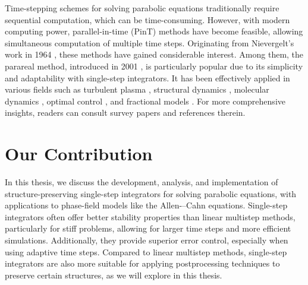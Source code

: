 \documentclass[a4paper, oneside]{book}
\begin{document}
Time-stepping schemes for solving parabolic equations traditionally require sequential computation, which can be time-consuming. However, with modern computing power, parallel-in-time (PinT) methods have become feasible, allowing simultaneous computation of multiple time steps. Originating from Nievergelt's work in 1964 \cite{Nievergelt:1964}, these methods have gained considerable interest. Among them, the parareal method, introduced in 2001 \cite{LionsMadayTurinici:2001}, is particularly popular due to its simplicity and adaptability with single-step integrators. It has been effectively applied in various fields such as turbulent plasma \cite{Reynolds-Barredo:2012, Reynolds-Barredo:2013}, structural dynamics \cite{CortialFarhat:2009, Farhat:2003}, molecular dynamics \cite{Baffico:2002}, optimal control \cite{MadaySalomonTurinici:2007, MathewSarkisSchaerer:2010}, and fractional models \cite{LiTangXu:2013, WuZhou:2017frac}. For more comprehensive insights, readers can consult survey papers \cite{Gander:2015, OngSchroder:2020} and references therein.


\section{Our Contribution}
In this thesis, we discuss the development, analysis, and implementation of structure-preserving single-step integrators for solving parabolic equations, with applications to phase-field models like the Allen-–Cahn equations. Single-step integrators often offer better stability properties than linear multistep methods, particularly for stiff problems, allowing for larger time steps and more efficient simulations. Additionally, they provide superior error control, especially when using adaptive time steps. Compared to linear multistep methods, single-step integrators are also more suitable for applying postprocessing techniques to preserve certain structures, as we will explore in this thesis.
\end{document}
